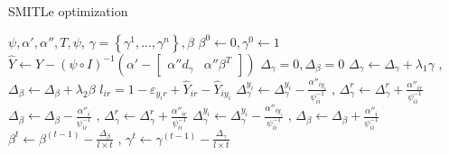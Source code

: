 \begin{algorithm}\label{alg:1}
       \caption{SMITLe optimization}\label{alg:1}
        \begin{algorithmic}[1]
            \REQUIRE $\psi,\alpha',\alpha'',T,\psi$,
            \ENSURE $\gamma=\left\{\gamma^1,...,\gamma^n\right\}, \beta$
            \STATE $\beta^0\leftarrow 0, \gamma^0 \leftarrow 1$
                \STATE $\hat Y \leftarrow Y - {\left( {\psi \circ I} \right)^{ - 1}}\left( {\alpha' - \left[ {\begin{array}{*{20}{c}}
{\alpha''d_\gamma }&{\alpha''\beta^T }
\end{array}} \right]} \right)$
                \STATE ${\Delta _\gamma }=0, {\Delta _\beta }=0$
                	\STATE ${\Delta _\gamma }\leftarrow {\Delta _\gamma }+\lambda_1\gamma$    , 
                	 ${\Delta _\beta }\leftarrow {\Delta _\beta }+\lambda_2\beta$
	                    \STATE $l_{ir} = 1 - {\varepsilon _{{y_i}r}} + {\hat Y_{ir}} - {\hat Y_{i{y_i}}}$
	                            \STATE $\Delta _\gamma^{{y_i}} \leftarrow \Delta _\gamma^{{y_i}} - \frac{{{\alpha''_{i{y_i}}}}}{{{\psi^{-1}_{ii}}}}$   ,   
	                             $\Delta _\gamma^{{r}} \leftarrow \Delta _\gamma^{{r}} + \frac{{{\alpha''_{i{r}}}}}{{{\psi^{-1}_{ii}}}}$%
	                            \STATE ${\Delta _\beta } \leftarrow {\Delta _\beta } - \frac{{{\alpha''_i}}}{{{\psi^{-1}_{ii}}}}$     ,
	                              $\Delta _\gamma^{{r}} \leftarrow \Delta _\gamma^{{r}} + \frac{{{\alpha''_{i{r}}}}}{{{\psi^{-1}_{ii}}}}$%
	                        \ELSE
	                            \STATE $\Delta _\gamma^{{y_i}} \leftarrow \Delta _\gamma^{{y_i}} - \frac{{{\alpha''_{i{y_i}}}}}{{{\psi^{-1}_{ii}}}}$      ,
	                            ${\Delta _\beta } \leftarrow {\Delta _\beta } + \frac{{{\alpha''_i}}}{{{\psi^{-1}_{ii}}}}$
	                        \ENDIF
	                    \ENDIF
	                 \ENDFOR %
                \ENDFOR %
                \STATE $\beta^t \leftarrow \beta^{(t-1)} - \frac{{{\Delta _\beta }}}{{l \times {t} }}$    ,
                 $\gamma^t  \leftarrow \gamma^{(t-1)}  - \frac{{{\Delta _\gamma }}}{{l\times {t} }}$
             \ENDFOR %
        \end{algorithmic}
\end{algorithm}
